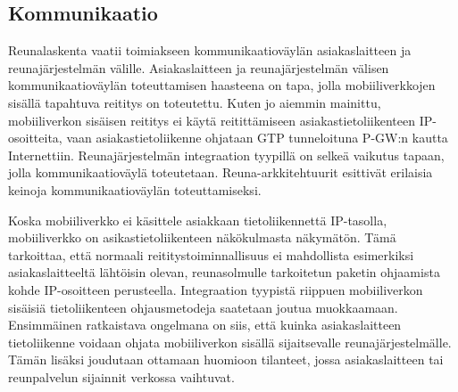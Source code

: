\subsection{Kommunikaatio} \label{kommunikaatio}
Reunalaskenta vaatii toimiakseen kommunikaatioväylän asiakaslaitteen ja reunajärjestelmän välille. 
Asiakaslaitteen ja reunajärjestelmän välisen kommunikaatioväylän toteuttamisen haasteena on tapa, jolla mobiiliverkkojen sisällä tapahtuva reititys on toteutettu. 
Kuten jo aiemmin mainittu, mobiiliverkon sisäisen reititys ei käytä reitittämiseen asiakastietoliikenteen IP-osoitteita, vaan asiakastietoliikenne ohjataan GTP tunneloituna P-GW:n kautta Internettiin. 
Reunajärjestelmän integraation tyypillä on selkeä vaikutus tapaan, jolla kommunikaatioväylä toteutetaan. Reuna-arkkitehtuurit esittivät erilaisia keinoja kommunikaatioväylän toteuttamiseksi.


%

Koska mobiiliverkko ei käsittele asiakkaan tietoliikennettä IP-tasolla, mobiiliverkko on asikastietoliikenteen näkökulmasta näkymätön.
Tämä tarkoittaa, että normaali reititystoiminnallisuus ei mahdollista esimerkiksi asiakaslaitteeltä lähtöisin olevan, reunasolmulle tarkoitetun paketin ohjaamista kohde IP-osoitteen perusteella. 
Integraation tyypistä riippuen mobiiliverkon sisäisiä tietoliikenteen ohjausmetodeja saatetaan joutua muokkaamaan.
Ensimmäinen ratkaistava ongelmana on siis, että kuinka asiakaslaitteen tietoliikenne voidaan ohjata mobiiliverkon sisällä sijaitsevalle reunajärjestelmälle.
Tämän lisäksi joudutaan ottamaan huomioon tilanteet, jossa asiakaslaitteen tai reunpalvelun sijainnit verkossa vaihtuvat.

